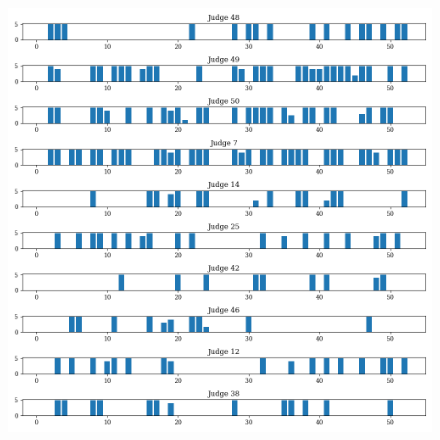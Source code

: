 \documentclass[11pt]{article}
\begin{document}
  \begin{figure}[H]
    \centering
    \includegraphics[width=\textwidth]{../../../output/figures/Exploration/JudgeID_weekly_judge_days_4}
  \end{figure}
\end{document}
